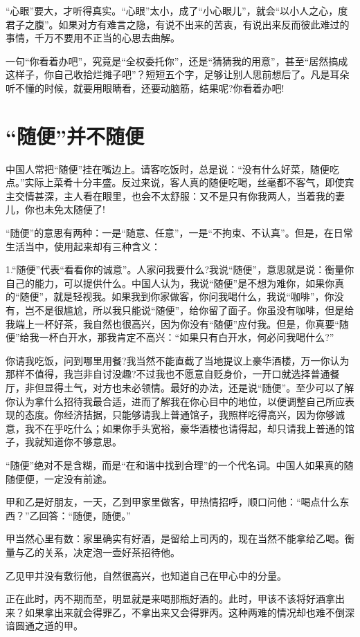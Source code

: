 \documentclass[fontset=fandol, a4paper, 12pt, openright]{ctexbook}
\begin{document}
“心眼”要大，才听得真实。“心眼”太小，成了“小心眼儿”，就会“以小人之心，度君子之腹”。如果对方有难言之隐，有说不出来的苦衷，有说出来反而彼此难过的事情，千万不要用不正当的心思去曲解。

一句“你看着办吧”，究竟是“全权委托你”，还是“猜猜我的用意”，甚至“居然搞成这样子，你自己收拾烂摊子吧”？短短五个字，足够让别人思前想后了。凡是耳朵听不懂的时候，就要用眼睛看，还要动脑筋，结果呢?你看着办吧!

\section{“随便”并不随便}

中国人常把“随便”挂在嘴边上。请客吃饭时，总是说：“没有什么好菜，随便吃点。”实际上菜肴十分丰盛。反过来说，客人真的随便吃喝，丝毫都不客气，即使宾主交情甚深，主人看在眼里，也会不太舒服：又不是只有你我两人，当着我的妻儿，你也未免太随便了!

“随便”的意思有两种：一是“随意、任意”，一是“不拘束、不认真”。但是，在日常生活当中，使用起来却有三种含义：

1.“随便”代表“看看你的诚意”。人家问我要什么?我说“随便”，意思就是说：衡量你自己的能力，可以提供什么。中国人认为，我说“随便”是不想为难你，如果你真的“随便”，就是轻视我。如果我到你家做客，你问我喝什么，我说“咖啡”，你没有，岂不是很尴尬，所以我只能说“随便”，给你留了面子。你虽没有咖啡，但是给我端上一杯好茶，我自然也很高兴，因为你没有“随便”应付我。但是，你真要“随便”给我一杯白开水，那我肯定不高兴：“如果只有白开水，何必问我喝什么?”

你请我吃饭，问到哪里用餐?我当然不能直截了当地提议上豪华酒楼，万一你认为那样不值得，我岂非自讨没趣?不过我也不愿意自贬身价，一开口就选择普通餐厅，非但显得土气，对方也未必领情。最好的办法，还是说“随便”。至少可以了解你认为拿什么招待我最合适，进而了解我在你心目中的地位，以便调整自己所应表现的态度。你经济拮据，只能够请我上普通馆子，我照样吃得高兴，因为你够诚意，我不在乎吃什么；如果你手头宽裕，豪华酒楼也请得起，却只请我上普通的馆子，我就知道你不够意思。

“随便”绝对不是含糊，而是“在和谐中找到合理”的一个代名词。中国人如果真的随随便便，一定没有前途。

甲和乙是好朋友，一天，乙到甲家里做客，甲热情招呼，顺口问他：“喝点什么东西？”乙回答：“随便，随便。”

甲当然心里有数：家里确实有好酒，是留给上司丙的，现在当然不能拿给乙喝。衡量与乙的关系，决定泡一壶好茶招待他。

乙见甲并没有敷衍他，自然很高兴，也知道自己在甲心中的分量。

正在此时，丙不期而至，明显就是来喝那瓶好酒的。此时，甲该不该将好酒拿出来？如果拿出来就会得罪乙，不拿出来又会得罪丙。这种两难的情况却也难不倒深谙圆通之道的甲。
\end{document}
